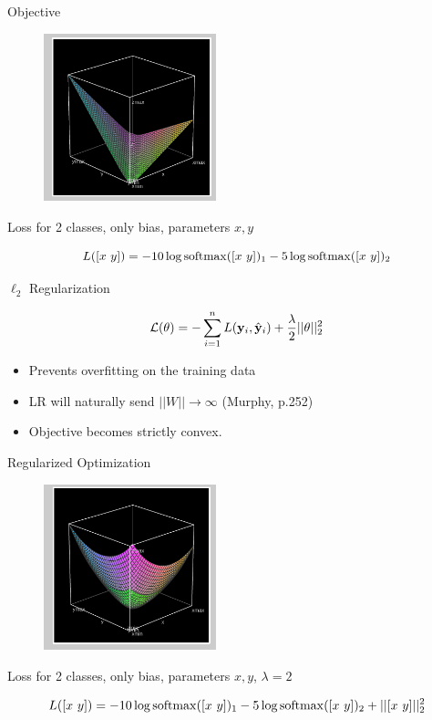 \documentclass{beamer}
\begin{document}
\begin{frame}{Objective}
  \begin{figure}
    \centering
    \includegraphics[width=5cm]{lrobj}
  \end{figure}
  
  \begin{center}
    Loss for 2 classes, only bias, parameters $x, y$
  \end{center}
  \[ L([x\ y]) = - 10 \log \softmax([x\ y])_1 -5\log \softmax([x\ y])_2 \] 

\end{frame}

\begin{frame}{$\ell_2$ Regularization}
 
  \[ \mathcal{L}(\theta) = - \sum_{i=1}^n L(\mathbf{y}_i, \hat{\mathbf{y}}_i) + \frac{\lambda}{2} ||\theta||^2_2\] 
  \begin{itemize}
  \item Prevents overfitting on the training data
  \item LR will naturally send $||W|| \rightarrow \infty$ (Murphy, p.252)  
  \item Objective becomes strictly convex.
  \end{itemize}

\end{frame}


\begin{frame}{Regularized Optimization}
  \begin{figure}
    \centering
    \includegraphics[width=5cm]{lrobjl2}
  \end{figure}
  
  \begin{center}
    Loss for 2 classes, only bias, parameters $x, y$, $\lambda=2$
  \end{center}
  \[ L([x\ y]) = - 10 \log \softmax([x\ y])_1 -5\log \softmax([x\ y])_2 + ||[x\ y]||_2^2\] 

\end{frame}
\end{document}
